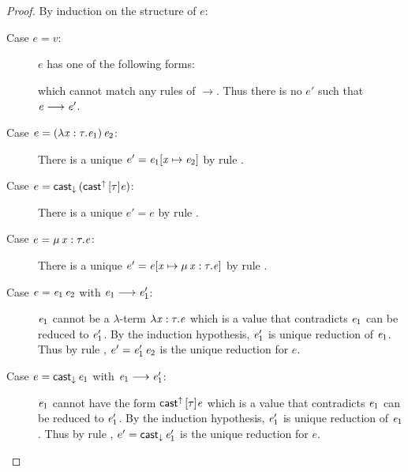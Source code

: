 \begin{proof}
	By induction on the structure of $e$:
	\begin{description}
		\item[Case $e=v$:] $e$ has one of the following forms:
		\begin{inparaenum}[(1)]
			\item $\lambda  \ottmv{x}  \ottsym{:}  \tau  \ottsym{.}  \ottnt{e}$,
			\item $\Pi \, \ottmv{x}  \ottsym{:}  \tau_{{\mathrm{1}}}  \ottsym{.}  \tau_{{\mathrm{2}}}$,
			\item $\mathsf{cast}^{\uparrow} \, \ottsym{[}  \tau  \ottsym{]}  \ottnt{e}$,
		\end{inparaenum}
		which cannot match any rules of $ \longrightarrow $. Thus there is no $e'$ such that $\mathit{e}  \longrightarrow  \mathit{e'}$.
		\item[Case $e=(  \lambda  \mathit{x}  :  \tau  .  \mathit{e_{{\mathrm{1}}}}  ) \, \mathit{e_{{\mathrm{2}}}}$:] There is a unique $e'=\mathit{e_{{\mathrm{1}}}}  [  \mathit{x}  \mapsto  \mathit{e_{{\mathrm{2}}}}  ]$ by rule .
		\item[Case $e=\mathsf{cast}_{\downarrow} \, (  \mathsf{cast}^{\uparrow} \, [  \tau  ]  \mathit{e}  )$:] There is a unique $e'=e$ by rule .
		\item[Case $e=\mu \, \mathit{x}  :  \tau  .  \mathit{e}$:] There is a unique $e'=\mathit{e}  [  \mathit{x}  \mapsto  \mu \, \mathit{x}  :  \tau  .  \mathit{e}  ]$ by rule .
		\item[Case $e=\mathit{e_{{\mathrm{1}}}} \, \mathit{e_{{\mathrm{2}}}}$ with $\mathit{e_{{\mathrm{1}}}}  \longrightarrow  \mathit{e'_{{\mathrm{1}}}}$:] $\mathit{e_{{\mathrm{1}}}}$ cannot be a $\lambda$-term $\lambda  \ottmv{x}  \ottsym{:}  \tau  \ottsym{.}  \ottnt{e}$ which is a value that contradicts $\mathit{e_{{\mathrm{1}}}}$ can be reduced to $\mathit{e'_{{\mathrm{1}}}}$. By the induction hypothesis, $\mathit{e'_{{\mathrm{1}}}}$ is unique reduction of $\mathit{e_{{\mathrm{1}}}}$. Thus by rule , $e'=\mathit{e'_{{\mathrm{1}}}} \, \mathit{e_{{\mathrm{2}}}}$ is the unique reduction for $e$.
		\item[Case $e=\mathsf{cast}_{\downarrow} \, \mathit{e_{{\mathrm{1}}}}$ with $\mathit{e_{{\mathrm{1}}}}  \longrightarrow  \mathit{e'_{{\mathrm{1}}}}$:] $\mathit{e_{{\mathrm{1}}}}$ cannot have the form $\mathsf{cast}^{\uparrow} \, \ottsym{[}  \tau  \ottsym{]}  \ottnt{e}$ which is a value that contradicts $\mathit{e_{{\mathrm{1}}}}$ can be reduced to $\mathit{e'_{{\mathrm{1}}}}$. By the induction hypothesis, $\mathit{e'_{{\mathrm{1}}}}$ is unique reduction of $\mathit{e_{{\mathrm{1}}}}$. Thus by rule , $e'=\mathsf{cast}_{\downarrow} \, \mathit{e'_{{\mathrm{1}}}}$ is the unique reduction for $e$.
	\end{description}
\end{proof}


